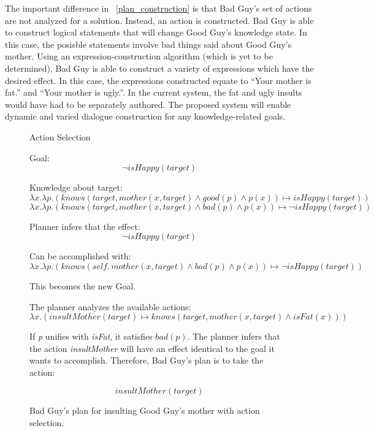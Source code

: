 \documentclass{article}
\begin{document}
The important difference in ~\ref{plan_construction} is that Bad Guy's
set of actions are not analyzed for a solution.  Instead, an action
is constructed.  Bad Guy is able to construct logical statements
that will change Good Guy's knowledge state.  In this case, the posisble
statements involve bad things said about Good Guy's mother.  Using
an expression-construction algorithm (which is yet to be determined),
Bad Guy is able to construct a variety of expressions which have the
desired effect.  In this case, the expressions constructed equate to
``Your mother is fat.'' and ``Your mother is ugly.''.  In the current
system, the fat and ugly insults would have had to be separately
authored.  The proposed system will enable dynamic and varied
dialogue construction for any knowledge-related goals.

\begin{figure}[h!]
  
  \begin{center}\large{Action Selection}\end{center}

  Goal:
  $$
  \neg isHappy(target)
  $$

  Knowledge about target:
  \[
  \lambda x.\lambda p.(knows(target, mother(x,target) \wedge good(p) \wedge p(x)) \mapsto isHappy(target))
  \]
  \[
  \lambda x.\lambda p.(knows(target, mother(x,target) \wedge bad(p) \wedge p(x)) \mapsto \neg isHappy(target))
  \]

  Planner infers that the effect:
  \[
  \neg isHappy(target)
  \]

  Can be accomplished with:
  \[
  \lambda x.\lambda p.(knows(self, mother(x,target) \wedge bad(p) \wedge p(x)) \mapsto \neg isHappy(target))
  \]

  This becomes the new Goal.

  The planner analyzes the available actions:
  \[
  \lambda x.(insultMother(target) \mapsto knows(target, mother(x, target) \wedge
  isFat(x))) 
  \]

  If \emph{p} unifies with \emph{isFat}, it satisfies $bad(p)$.  The planner infers that
  the action \emph{insultMother} will have an effect identical to the goal it wants to accomplish.
  Therefore, Bad Guy's plan is to take the action:
  
  \[
  insultMother(target)
  \]

  \caption{Bad Guy's plan for insulting Good Guy's mother with action selection.}
  \label{plan_selection}
\end{figure}
\end{document}
